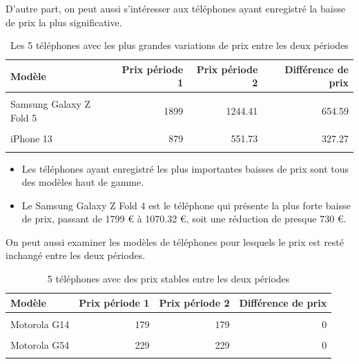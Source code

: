 \documentclass[
  12pt,
]{report}
\begin{document}
D'autre part, on peut aussi s'intéresser aux téléphones ayant enregistré
la baisse de prix la plus significative.

\begin{table}[!h]
\centering
\caption{\label{tab:unnamed-chunk-21}Les 5 téléphones avec les plus grandes variations de prix entre les deux périodes}
\centering
\begin{tabular}[t]{lrrr}
\toprule
\textbf{Modèle} & \textbf{Prix période 1} & \textbf{Prix période 2} & \textbf{Différence de prix}\\
\midrule
\cellcolor{gray!10}{Samsung Galaxy Z Fold 4} & \cellcolor{gray!10}{1799} & \cellcolor{gray!10}{1070.32} & \cellcolor{gray!10}{728.68}\\
Samsung Galaxy Z Fold 5 & 1899 & 1244.41 & 654.59\\
\cellcolor{gray!10}{Samsung Galaxy Z Flip 5} & \cellcolor{gray!10}{1199} & \cellcolor{gray!10}{783.90} & \cellcolor{gray!10}{415.10}\\
iPhone 13 & 879 & 551.73 & 327.27\\
\cellcolor{gray!10}{iPhone 14 Plus} & \cellcolor{gray!10}{969} & \cellcolor{gray!10}{704.90} & \cellcolor{gray!10}{264.10}\\
\bottomrule
\end{tabular}
\end{table}

\begin{itemize}
\item
  Les téléphones ayant enregistré les plus importantes baisses de prix
  sont tous des modèles haut de gamme.
\item
  Le Samsung Galaxy Z Fold 4 est le téléphone qui présente la plus forte
  baisse de prix, passant de 1799 € à 1070.32 €, soit une réduction de
  presque 730 €.
\end{itemize}

On peut aussi examiner les modèles de téléphones pour lesquels le prix
est resté inchangé entre les deux périodes.

\begin{table}[!h]
\centering
\caption{\label{tab:unnamed-chunk-22}5 téléphones avec des prix stables entre les deux périodes}
\centering
\begin{tabular}[t]{lrrr}
\toprule
\textbf{Modèle} & \textbf{Prix période 1} & \textbf{Prix période 2} & \textbf{Différence de prix}\\
\midrule
\cellcolor{gray!10}{MOTOROLA EDGE 40 NEO} & \cellcolor{gray!10}{399} & \cellcolor{gray!10}{399} & \cellcolor{gray!10}{0}\\
Motorola G14 & 179 & 179 & 0\\
\cellcolor{gray!10}{Motorola G53} & \cellcolor{gray!10}{199} & \cellcolor{gray!10}{199} & \cellcolor{gray!10}{0}\\
Motorola G54 & 229 & 229 & 0\\
\cellcolor{gray!10}{Motorola G84} & \cellcolor{gray!10}{299} & \cellcolor{gray!10}{299} & \cellcolor{gray!10}{0}\\
\bottomrule
\end{tabular}
\end{table}
\end{document}
